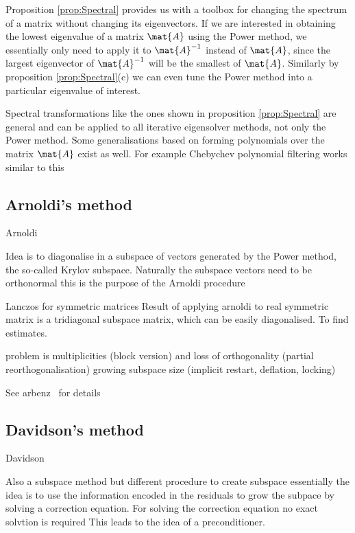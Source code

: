 Proposition \ref{prop:Spectral} provides us with a toolbox for
changing the spectrum of a matrix without changing its eigenvectors.
If we are interested in obtaining the lowest eigenvalue of a matrix $\mat{A}$
using the Power method,
we essentially only need to apply it to $\mat{A}^{-1}$ instead
of  $\mat{A}$, since the largest eigenvector of $\mat{A}^{-1}$ will be
the smallest of $\mat{A}$.
Similarly by proposition \ref{prop:Spectral}(c)
we can even tune the Power method into a particular eigenvalue of interest.

Spectral transformations like the ones shown in proposition \ref{prop:Spectral}
are general and can be applied to all iterative eigensolver methods,
not only the Power method.
Some generalisations based on forming polynomials over the matrix $\mat{A}$
exist as well.
For example Chebychev polynomial filtering works similar to this


\subsection{Arnoldi's method}
\label{sec:Arnoldi}
Arnoldi~\cite{Arnoldi1951}

Idea is to diagonalise in a subspace of vectors generated by the
Power method,
the so-called Krylov subspace.
Naturally the subspace vectors need to be orthonormal
this is the purpose of the Arnoldi procedure

Lanczos for symmetric matrices
Result of applying arnoldi to real symmetric matrix
is a tridiagonal subspace matrix,
which can be easily diagonalised.
To find estimates.

problem is multiplicities (block version)
and loss of orthogonality (partial reorthogonalisation)
growing subspace size (implicit restart, deflation, locking)

See arbenz~\cite{Arbenz2010} for details

\subsection{Davidson's method}
\label{sec:Davidson}
Davidson~\cite{Davidson1975}

Also a subspace method but different procedure to create subspace
essentially the idea is to use the information encoded in the residuals
to grow the subpace
by solving a correction equation.
For solving the correction equation no exact solvtion is required
This leads to the idea of a preconditioner.


